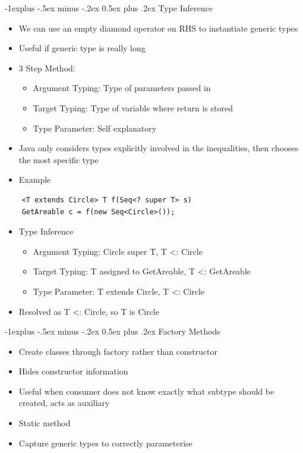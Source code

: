 \documentclass[10pt, landscape]{article}
\makeatletter
\renewcommand{\section}{\@startsection{section}{1}{0mm}%
                                {-1ex plus -.5ex minus -.2ex}%
                                {0.5ex plus .2ex}%
                                {\normalfont\large\bfseries}}
\renewcommand{\section}{\@startsection{section}{2}{0mm}%
                                {-1explus -.5ex minus -.2ex}%
                                {0.5ex plus .2ex}%
                                {\normalfont\normalsize\bfseries}}
\makeatother
\begin{document}
\begin{multicols*}{4}
\section{Type Inference}
\begin{itemize}
    \item We can use an empty diamond operator on RHS to instantiate generic types
    \item Useful if generic type is really long
    \item 3 Step Method:
    \begin{itemize}
        \item Argument Typing: Type of parameters passed in
        \item Target Typing: Type of variable where return is stored
        \item Type Parameter: Self explanatory
    \end{itemize}
    \item Java only considers types explicitly involved in the inequalities, then chooses the most specific type
    \item Example
\end{itemize}
\begin{lstlisting}
    <T extends Circle> T f(Seq<? super T> s)
    GetAreable c = f(new Seq<Circle>());
\end{lstlisting}
\begin{itemize}
    \item Type Inference
    \begin{itemize}
        \item Argument Typing: Circle super T, T <: Circle
        \item Target Typing: T assigned to GetAreable, T <: GetAreable
        \item Type Parameter: T extends Circle, T <: Circle
    \end{itemize}
    \item Resolved as T <: Circle, so T is Circle
\end{itemize}

\section{Factory Methods}
\begin{itemize}
    \item Create classes through factory rather than constructor
    \item Hides constructor information
    \item Useful when consumer does not know exactly what subtype should be created, acts as auxiliary
    \item Static method
    \item Capture generic types to correctly parameterise
\end{itemize}


\end{multicols*}
\end{document}
